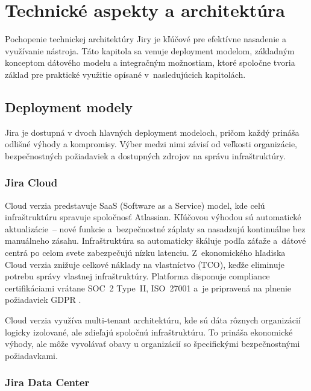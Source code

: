 
\chapter{Technické aspekty a architektúra}\label{ch:technicke-aspekty}

Pochopenie technickej architektúry Jiry je kľúčové pre efektívne nasadenie a využívanie nástroja. Táto kapitola sa venuje deployment modelom, základným konceptom dátového modelu a integračným možnostiam, ktoré spoločne tvoria základ pre praktické využitie opísané v~nasledujúcich kapitolách.

\section{Deployment modely}

Jira je dostupná v dvoch hlavných deployment modeloch, pričom každý prináša odlišné výhody a kompromisy. Výber medzi nimi závisí od veľkosti organizácie, bezpečnostných požiadaviek a dostupných zdrojov na správu infraštruktúry.

\subsection{Jira Cloud}

Cloud verzia predstavuje SaaS (Software as a Service) model, kde celú infraštruktúru spravuje spoločnosť Atlassian. Kľúčovou výhodou sú automatické aktualizácie~-- nové funkcie a~bezpečnostné záplaty sa nasadzujú kontinuálne bez manuálneho zásahu. Infraštruktúra sa automaticky škáluje podľa záťaže a~dátové centrá po celom svete zabezpečujú nízku latenciu. Z~ekonomického hľadiska Cloud verzia znižuje celkové náklady na vlastníctvo (TCO), keďže eliminuje potrebu správy vlastnej infraštruktúry. Platforma disponuje compliance certifikáciami vrátane SOC~2 Type~II, ISO~27001 a~je pripravená na plnenie požiadaviek GDPR \cite{atlassian_trust2024}.

Cloud verzia využíva multi-tenant architektúru, kde sú dáta rôznych organizácií logicky izolované, ale zdieľajú spoločnú infraštruktúru. To prináša ekonomické výhody, ale môže vyvolávať obavy u organizácií so špecifickými bezpečnostnými požiadavkami.

\subsection{Jira Data Center}

